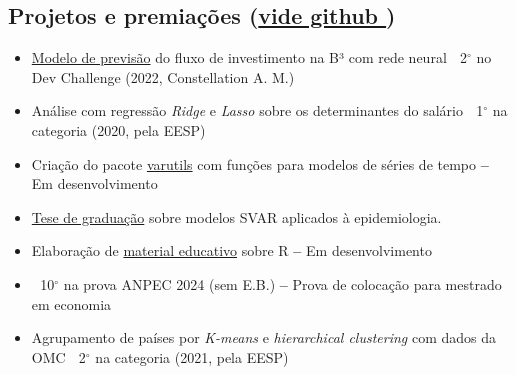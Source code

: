 \documentclass[11pt,letterpaper]{article}
\begin{document}
\subsection*{Projetos e premiações \small(\href{https://github.com/ricardo-semiao}{vide github \textmd{\faGithub}})\normalsize }
\begin{minipage}[t]{.47\textwidth}
\begin{itemize}
    \item \href{https://github.com/ricardo-semiao/challenge-constdev}{Modelo de previsão} do fluxo de investimento na B³ com rede neural\newline
    \small \faTrophy$\;$ 2$^{\circ}$ no Dev Challenge (2022, Constellation A. M.)\normalsize

    \item Análise com regressão \textit{Ridge} e \textit{Lasso} sobre os determinantes do salário\newline
    \small \faTrophy$\;$ 1$^{\circ}$ na categoria (2020, pela EESP)\normalsize

    \item Criação do pacote \href{https://ricardo-semiao.github.io/varutils/}{varutils} com funções para modelos de séries de tempo\newline
    \small \textbf{--} Em desenvolvimento \normalsize %
\end{itemize}
\end{minipage}
\hfill
\begin{minipage}[t]{.47\textwidth}
\begin{itemize}
    \item \href{https://github.com/ricardo-semiao/article-covid-svardiff}{Tese de graduação} sobre modelos SVAR aplicados à epidemiologia.

    \item Elaboração de \href{https://ricardo-semiao.github.io/course-r/}{material educativo} sobre R\newline
    \small \textbf{--} Em desenvolvimento \normalsize

    \item \faTrophy$\;$ 10$^{\circ}$ na prova ANPEC 2024 (sem E.B.)\newline
    \small \textbf{--} Prova de colocação para mestrado em economia\normalsize

    \item Agrupamento de países por \textit{K-means} e \textit{hierarchical clustering} com dados da OMC\newline
    \small \faTrophy$\;$ 2$^{\circ}$ na categoria (2021, pela EESP)\normalsize

\end{itemize}
\end{minipage}
\end{document}
